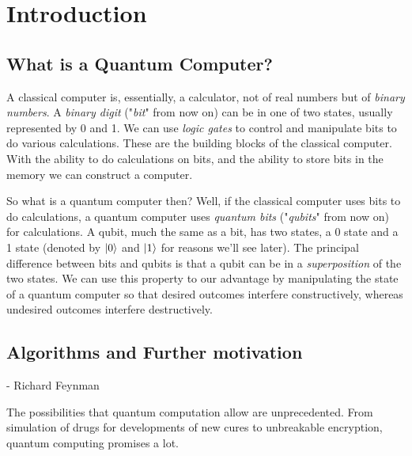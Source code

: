 \section{Introduction}
\subsection{What is a Quantum Computer?}
 A classical computer is, essentially, a calculator, not of real numbers but of \textit{binary numbers}. A \textit{binary digit} ("\textit{bit}" from now on) can be in one of two states, usually represented by 0 and 1. We can use \textit{logic gates} to control and manipulate bits to do various calculations. These are the building blocks of the classical computer. With the ability to do calculations on bits, and the ability to store bits in the memory we can construct a computer.
 
So what is a quantum computer then? Well, if the classical computer uses bits to do calculations, a quantum computer uses \textit{quantum bits} ("\textit{qubits}" from now on) for calculations. A qubit, much the same as a bit, has two states, a 0 state and a 1 state (denoted by $\ket{0}$ and $\ket{1}$ for reasons we'll see later). The principal difference between bits and qubits is that a qubit can be in a \textit{superposition} of the two states. We can use this property to our advantage by manipulating the state of a quantum computer so that desired outcomes interfere constructively, whereas undesired outcomes interfere destructively.

\subsection{Algorithms and Further motivation}
 \begin{quotation}
 \end{quotation}
\centerline{- Richard Feynman}
The possibilities that quantum computation allow are unprecedented. From simulation of drugs for developments of new cures to unbreakable encryption, quantum computing promises a lot. 

